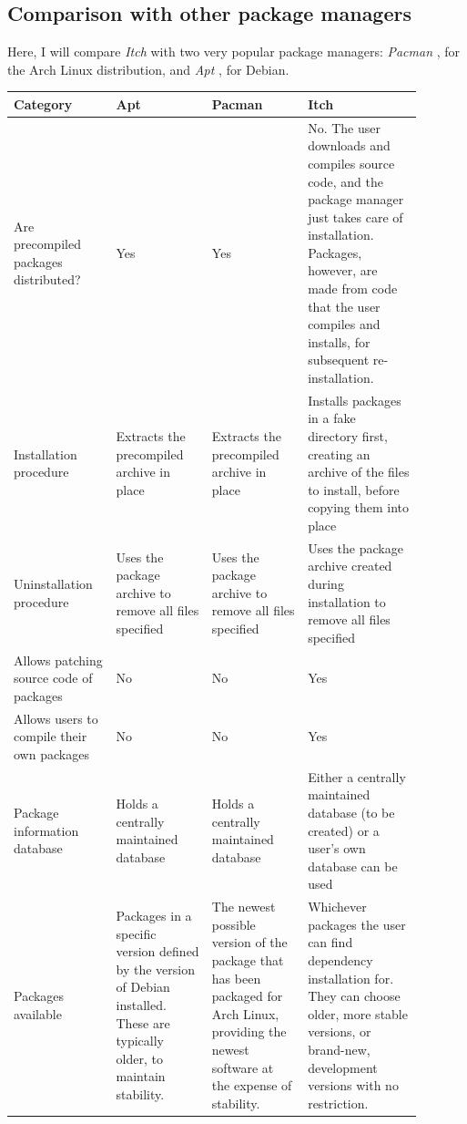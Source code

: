 \documentclass[10pt]{article}
\begin{document}
\subsection{Comparison with other package managers}

Here, I will compare \textit{Itch} with two very popular package managers: \textit{Pacman} \cite{ArchWikiPacman}, for the Arch Linux distribution, and \textit{Apt} \cite{AptSource}, for Debian.

\begin{center}
\begin{longtable}{|p{0.22\linewidth}|p{0.21\linewidth}|p{0.21\linewidth}|p{0.25\linewidth}|}
    \hline
    \textbf{Category} & \textbf{Apt} & \textbf{Pacman} & \textbf{Itch} \\
    \hline
    Are precompiled packages distributed? & Yes & Yes & No. The user downloads and compiles source code, and the package manager just takes care of installation. Packages, however, are made from code that the user compiles and installs, for subsequent re-installation. \\
    \hline
    Installation procedure & Extracts the precompiled archive in place & Extracts the precompiled archive in place & Installs packages in a fake directory first, creating an archive of the files to install, before copying them into place \\
    \hline
    Uninstallation procedure & Uses the package archive to remove all files specified & Uses the package archive to remove all files specified & Uses the package archive created during installation to remove all files specified \\
    \hline
    Allows patching source code of packages & No & No & Yes \\
    \hline
    Allows users to compile their own packages & No & No & Yes \\
    \hline
    Package information database & Holds a centrally maintained database & Holds a centrally maintained database & Either a centrally maintained database (to be created) or a user's own database can be used \\
    \hline
    Packages available & Packages in a specific version defined by the version of Debian installed. These are typically older, to maintain stability. & The newest possible version of the package that has been packaged for Arch Linux, providing the newest software at the expense of stability. & Whichever packages the user can find dependency installation for. They can choose older, more stable versions, or brand-new, development versions with no restriction. \\

\end{longtable}
\end{center}
\end{document}
